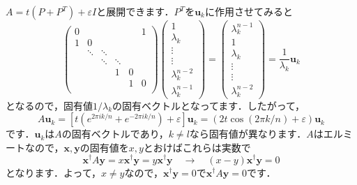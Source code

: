 \documentclass[a4paper,pdflatex,ja=standard]{bxjsarticle}
\begin{document}
\begin{enumerate}
\begin{enumerate}
    $A=t(P+P^{T})+\varepsilon I$と展開できます．$P^{T}$を$\bm{u}_k$に作用させてみると
    \begin{equation}    
      \begin{pmatrix}
        0 &  &   &   &   &   1  \\
        1  & 0 &  &   &   &     \\
          &  \ddots   & \ddots &  &  &     \\
          &   &     \ddots    &  \ddots  & &    \\
          &   &        &      1    &      0 &   \\        
          &   &        &          &   1    & 0 \\
      \end{pmatrix}
      \begin{pmatrix}
        1 \\
        \lambda_k \\
        \vdots \\
        \vdots \\
        \lambda_k^{n-2} \\
        \lambda_k^{n-1}
      \end{pmatrix}
      =
      \begin{pmatrix}
        \lambda_k^{n-1} \\
        1 \\
        \lambda_k \\
        \vdots \\
        \vdots \\
        \lambda_k^{n-2}
      \end{pmatrix}
      =
      \frac{1}{\lambda_k}
      \bm{u}_k
    \end{equation}
    となるので，固有値$1/\lambda_k$の固有ベクトルとなってます．したがって，
    \begin{equation}
      A\bm{u}_k
      =
      \left[  
        t\left( e^{2\pi ik/n}+e^{-2\pi ik/n} \right)
        +
        \varepsilon
      \right]
      \bm{u}_k
      =
      (2t\cos(2\pi k/n)+\varepsilon)
      \bm{u}_k
    \end{equation}
    です．$\bm{u}_k$は$A$の固有ベクトルであり，$k\neq l$なら固有値が異なります．$A$はエルミートなので，$\bm{x},\bm{y}$の固有値を$x,y$とおけばこれらは実数で
    \begin{equation}
      \bm{x}^{\dag}A\bm{y}
      =
      x
      \bm{x}^{\dag}\bm{y}
      =
      y
      \bm{x}^{\dag}\bm{y}
      \quad
      \rightarrow
      \quad
      (x-y)
      \bm{x}^{\dag}\bm{y}
      =
      0
    \end{equation}
    となります．よって，$x\neq y$なので，$\bm{x}^{\dag}\bm{y}=0$で$\bm{x}^{\dag}A\bm{y}=0$です．



\end{enumerate}
\end{enumerate}
\end{document}
